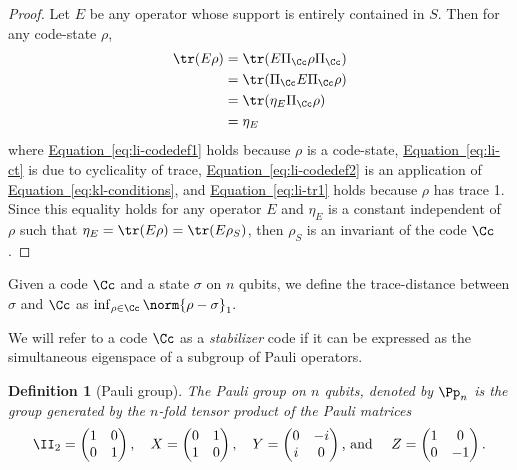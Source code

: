 \documentclass[11pt]{article}
\newcommand{\expeqref}[2]{\texorpdfstring{\hyperref[#2]{#1~\eqref{#2}}}{#1~\eqref{#2}}}
\newtheorem{definition}[theorem]{Definition}
\begin{document}
\begin{proof}
Let $E$ be any operator whose support is entirely contained in $S$. Then for any code-state $\rho$,
\begin{align}
\tr(E\rho) &= \tr(E \Pi_\Cc \rho \Pi_\Cc) \label{eq:li-codedef1} \\
&= \tr(\Pi_\Cc E \Pi_\Cc \rho) \label{eq:li-ct} \\
&= \tr(\eta_E \Pi_\Cc \rho) \label{eq:li-codedef2} \\
&= \eta_E \label{eq:li-tr1}
\end{align}
where \expeqref{Equation}{eq:li-codedef1} %
holds  %
because $\rho$ is a code-state, \expeqref{Equation}{eq:li-ct} is due to cyclicality of trace,
 \expeqref{Equation}{eq:li-codedef2} is an application of \expeqref{Equation}{eq:kl-conditions}, 
and \expeqref{Equation}{eq:li-tr1} %
holds  %
because $\rho$ has trace 1. Since this equality holds for any operator $E$ and $\eta_E$ is a constant independent of $\rho$ such that $\eta_E = \tr(E\rho) = \tr(E \rho_S)$, then $\rho_S$ is an invariant of the code $\Cc$.
\end{proof}


Given a code $\Cc$ and a state $\sigma$ on $n$ qubits, we define the trace-distance between $\sigma$ and $\Cc$ as $    \inf_{\rho \in \Cc} \norm{\rho - \sigma}_1.$

We will refer to a code $\Cc$ as a \emph{stabilizer} code if it can be expressed as the simultaneous eigenspace of a subgroup of Pauli operators.

\begin{definition}[Pauli group]
The Pauli group on $n$ qubits, denoted by $\Pp_n$ is the group generated by the $n$-fold tensor product of the Pauli matrices
\begin{align}
    \II_2 = \begin{pmatrix} 1 & 0 \\ 0 & 1\end{pmatrix}, \quad X = \begin{pmatrix} 0 & 1 \\ 1 & 0 \end{pmatrix}, \quad Y = \begin{pmatrix} 0 & -i \\i & 0\end{pmatrix} \textrm{, and }\quad Z = \begin{pmatrix} 1 & 0 \\ 0 & -1\end{pmatrix}.
\end{align}
\end{definition}
\end{document}
